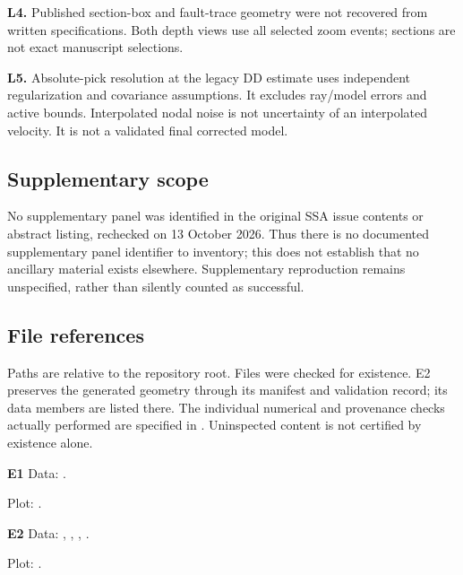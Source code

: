 \noindent\textbf{L4.} Published section-box and fault-trace geometry were not recovered from written specifications. Both depth views use all selected zoom events; sections are not exact manuscript selections.\par\smallskip

\noindent\textbf{L5.} Absolute-pick resolution at the legacy DD estimate uses independent regularization and covariance assumptions. It excludes ray/model errors and active bounds. Interpolated nodal noise is not uncertainty of an interpolated velocity. It is not a validated final corrected model.\par\smallskip

\subsection*{Supplementary scope}

No supplementary panel was identified in the original SSA issue contents or abstract listing, rechecked on 13 October 2026. Thus there is no documented supplementary panel identifier to inventory; this does not establish that no ancillary material exists elsewhere. Supplementary reproduction remains unspecified, rather than silently counted as successful.

\subsection*{File references}

Paths are relative to the repository root. Files were checked for existence. E2 preserves the generated geometry through its manifest and validation record; its data members are listed there. The individual numerical and provenance checks actually performed are specified in . Uninspected content is not certified by existence alone.

\footnotesize

\noindent\textbf{E1} Data: .\par Plot: .\par\medskip

\noindent\textbf{E2} Data: , , , .\par Plot: .\par\medskip

